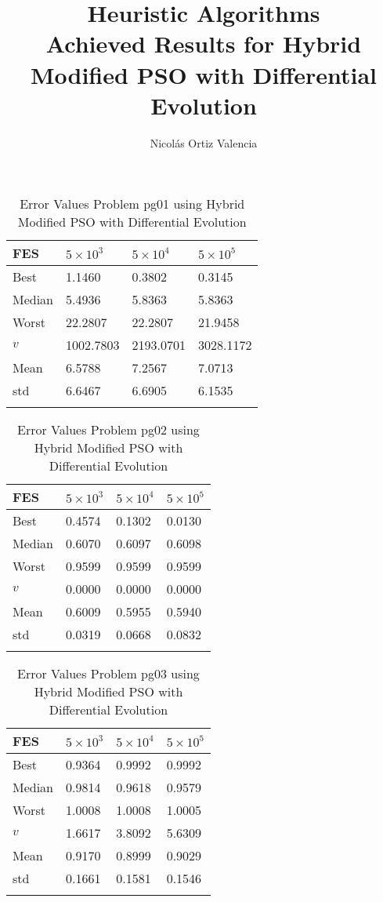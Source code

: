 \documentclass[10pt, a4paper]{book}
\title{
    Heuristic Algorithms \\
    \large Achieved Results for Hybrid Modified PSO with Differential Evolution\\
}
\author{Nicolás Ortiz Valencia}
\begin{document}
\maketitle


\begin{center}
\begin{longtable}{l l l l}
FES & $5 \times 10^{3}$ & $5 \times 10^{4}$ & $5 \times 10^{5}$ \\
\hline
Best & 1.1460 & 0.3802 & 0.3145 \\
Median & 5.4936 & 5.8363 & 5.8363 \\
Worst & 22.2807 & 22.2807 & 21.9458 \\
$v$ & 1002.7803 & 2193.0701 & 3028.1172 \\
Mean & 6.5788 & 7.2567 & 7.0713 \\
std & 6.6467 & 6.6905 & 6.1535 \\
\caption{ Error Values Problem pg01 using Hybrid Modified PSO with Differential Evolution }
\end{longtable}
\end{center}

\begin{center}
\begin{longtable}{l l l l}
FES & $5 \times 10^{3}$ & $5 \times 10^{4}$ & $5 \times 10^{5}$ \\
\hline
Best & 0.4574 & 0.1302 & 0.0130 \\
Median & 0.6070 & 0.6097 & 0.6098 \\
Worst & 0.9599 & 0.9599 & 0.9599 \\
$v$ & 0.0000 & 0.0000 & 0.0000 \\
Mean & 0.6009 & 0.5955 & 0.5940 \\
std & 0.0319 & 0.0668 & 0.0832 \\
\caption{ Error Values Problem pg02 using Hybrid Modified PSO with Differential Evolution }
\end{longtable}
\end{center}

\begin{center}
\begin{longtable}{l l l l}
FES & $5 \times 10^{3}$ & $5 \times 10^{4}$ & $5 \times 10^{5}$ \\
\hline
Best & 0.9364 & 0.9992 & 0.9992 \\
Median & 0.9814 & 0.9618 & 0.9579 \\
Worst & 1.0008 & 1.0008 & 1.0005 \\
$v$ & 1.6617 & 3.8092 & 5.6309 \\
Mean & 0.9170 & 0.8999 & 0.9029 \\
std & 0.1661 & 0.1581 & 0.1546 \\
\caption{ Error Values Problem pg03 using Hybrid Modified PSO with Differential Evolution }
\end{longtable}
\end{center}
\end{document}

